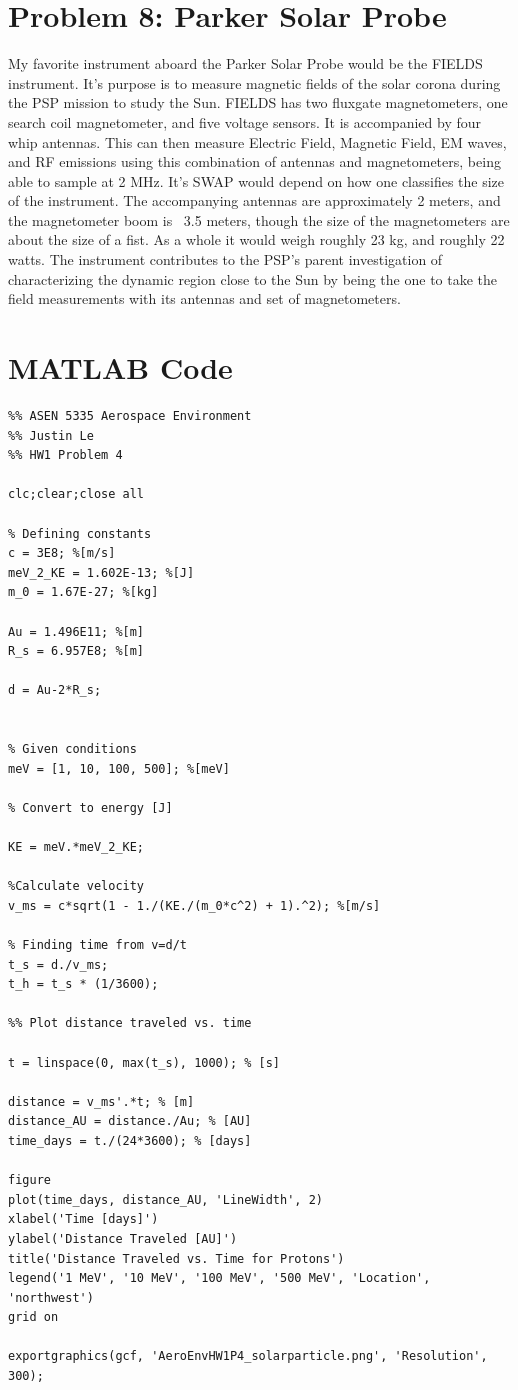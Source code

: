 \documentclass[11pt]{article}
\begin{document}
\section*{Problem 8: Parker Solar Probe}
\hspace*{2em}My favorite instrument aboard the Parker Solar Probe would be the
FIELDS instrument. It's purpose is to measure magnetic fields of the
solar corona during the PSP mission to study the Sun. FIELDS has two fluxgate magnetometers,
one search coil magnetometer, and five voltage sensors. It is accompanied
by four whip antennas. This can then measure Electric Field, Magnetic Field,
EM waves, and RF emissions using this combination of antennas and magnetometers, being able to sample at 2 MHz.
It's SWAP would depend on how one classifies the size of the instrument. The 
accompanying antennas are approximately 2 meters, and the magnetometer boom is ~3.5 meters,
though the size of the magnetometers are about the size of a fist.
As a whole it would weigh roughly 23 kg, and roughly 22 watts. The instrument contributes
to the PSP's parent investigation of characterizing the dynamic region close to the Sun by
being the one to take the field measurements with its antennas and set of magnetometers.

\newpage
\section*{MATLAB Code}
\begin{verbatim}
%% ASEN 5335 Aerospace Environment
%% Justin Le
%% HW1 Problem 4

clc;clear;close all

% Defining constants
c = 3E8; %[m/s]
meV_2_KE = 1.602E-13; %[J]
m_0 = 1.67E-27; %[kg]

Au = 1.496E11; %[m]
R_s = 6.957E8; %[m]

d = Au-2*R_s;


% Given conditions
meV = [1, 10, 100, 500]; %[meV]

% Convert to energy [J]

KE = meV.*meV_2_KE;

%Calculate velocity
v_ms = c*sqrt(1 - 1./(KE./(m_0*c^2) + 1).^2); %[m/s] 

% Finding time from v=d/t
t_s = d./v_ms;
t_h = t_s * (1/3600);

%% Plot distance traveled vs. time

t = linspace(0, max(t_s), 1000); % [s]

distance = v_ms'.*t; % [m]
distance_AU = distance./Au; % [AU]
time_days = t./(24*3600); % [days]

figure
plot(time_days, distance_AU, 'LineWidth', 2)
xlabel('Time [days]')
ylabel('Distance Traveled [AU]')
title('Distance Traveled vs. Time for Protons')
legend('1 MeV', '10 MeV', '100 MeV', '500 MeV', 'Location', 'northwest')
grid on

exportgraphics(gcf, 'AeroEnvHW1P4_solarparticle.png', 'Resolution', 300);
\end{verbatim}
\end{document}
